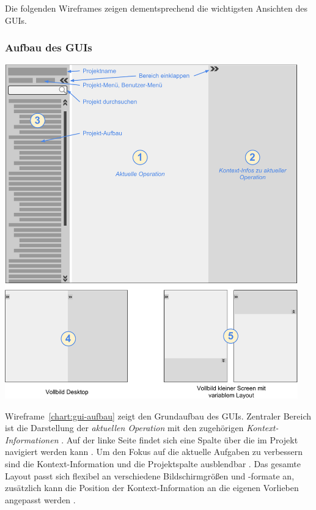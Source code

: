 \bigskip

Die folgenden Wireframes zeigen dementsprechend die wichtigsten Ansichten des GUIs.

\pagebreak

\subsubsection{Aufbau des GUIs}\label{l:gui-aufbau}

\begin{center}
\includegraphics[width=0.95\textwidth]{media/GUIAufbau.pdf}
\label{chart:gui-aufbau}
\end{center}

Wireframe~\ref{chart:gui-aufbau} zeigt den Grundaufbau des GUIs. Zentraler Bereich ist die Darstellung der \emph{aktuellen Operation}  mit den zugehörigen \emph{Kontext-Informationen} . Auf der linke Seite findet sich eine Spalte über die im Projekt navigiert werden kann . Um den Fokus auf die aktuelle Aufgaben zu verbessern sind die Kontext-Information und die Projektspalte ausblendbar . Das gesamte Layout passt sich flexibel an verschiedene Bildschirmgrößen und -formate an, zusätzlich kann die Position der Kontext-Information an die eigenen Vorlieben angepasst werden .

